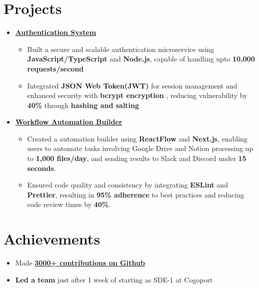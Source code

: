 \documentclass[letterpaper,11pt]{article}
\newcommand{\resumeItem}[1]{
  \item\small{
    {#1}
  }\vspace{3pt}
}
\newcommand{\resumeProjectHeading}[2]{
  \vspace{-1pt}\item
    \textbf{#1}\hspace{0.5em}\small{#2}\vspace{-5pt}
}
\newcommand{\resumeSubHeadingListStart}{\begin{itemize}[leftmargin=*]}
\newcommand{\resumeSubHeadingListEnd}{\end{itemize}}
\newcommand{\resumeItemListStart}{\begin{itemize}}
\newcommand{\resumeItemListEnd}{\end{itemize}\vspace{-5pt}}
\begin{document}
\section{Projects}
  \resumeSubHeadingListStart
    \resumeProjectHeading
      {\href{https://github.com/taufeeq-ahmed/tickets-microservice}{Authentication System}}{} %
      \resumeItemListStart
        \resumeItem
          {Built a secure and scalable authentication microservice using \textbf{JavaScript/TypeScript} and \textbf{Node.js}, capable of handling upto \textbf{10,000 requests/second}}
        \vspace{0pt}
        \resumeItem
          {Integrated \textbf{JSON Web Token(JWT)} for session management and enhanced security with \textbf{bcrypt encryption} , reducing vulnerability by \textbf{40\%} through \textbf{hashing and salting}}
        \vspace{-5pt}
      \resumeItemListEnd
    \resumeProjectHeading
      {\href{https://github.com/taufeeq-ahmed/electra-automation-builder}{Workflow Automation Builder}}{} %
      \resumeItemListStart
        \resumeItem
          {Created a automation builder using \textbf{ReactFlow} and \textbf{Next.js}, enabling users to automate tasks involving Google Drive and Notion processing up to \textbf{1,000 files/day}, and sending results to Slack and Discord under \textbf{15 seconds}.}
        \vspace{0pt}
        \resumeItem
          {Ensured code quality and consistency by integrating \textbf{ESLint} and \textbf{Prettier}, resulting in \textbf{95\% adherence} to best practices and reducing code review times by \textbf{40\%}.}
        \vspace{-5pt}
      \resumeItemListEnd
  \resumeSubHeadingListEnd
%

%
\section{Achievements}
  \resumeItemListStart
        \resumeItem
          {Made \textbf{\href{https://github.com/taufeeq-ahmed}{3000+ contributions on Github}}}
        \vspace{-10pt}
        \resumeItem
          {\textbf{Led a team} just after 1 week of starting as SDE-1 at Cogoport}
        \vspace{-10pt}
      \resumeItemListEnd

%

\end{document}
